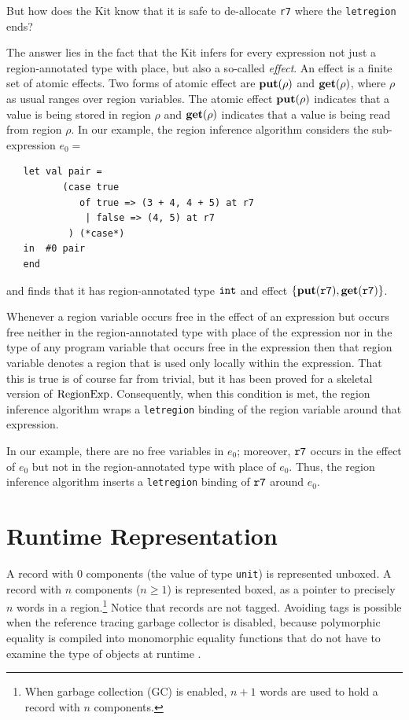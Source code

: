 \documentclass[12pt]{book}
\begin{document}
But how does the Kit know that it is safe to 
%
de-allocate {\tt r7} where the
%
{\tt letregion} ends?

The answer lies in the fact that the Kit infers for every expression
not just a region-annotated type with place, but also a so-called 
%
{\em effect}.  An effect is a finite set of 
%
atomic effects. Two forms of atomic effect are
%
$\mathop{\bf put}\nolimits(\rho)$ and 
%
$\mathop{\bf get}\nolimits(\rho)$, where $\rho$ as usual ranges over region variables. The
atomic effect $\mathop{\bf put}\nolimits(\rho)$ indicates that a value is being stored in
region $\rho$ and $\mathop{\bf get}\nolimits(\rho)$ indicates that a value is being read
from region $\rho$.  In our example, the region inference algorithm
considers the sub-expression $e_0 = $
\begin{verbatim}
   let val pair = 
          (case true 
             of true => (3 + 4, 4 + 5) at r7 
              | false => (4, 5) at r7
           ) (*case*) 
   in  #0 pair
   end  
\end{verbatim}
and finds that it has region-annotated type $\hbox{\tt int}$ and effect
$\{\mathop{\bf put}\nolimits(\hbox{\tt r7}), \mathop{\bf get}\nolimits(\hbox{\tt r7})\}$.

Whenever a region variable occurs free in the effect of an expression
but occurs free neither in the region-annotated type with place of the
expression nor in the type of any program variable that occurs free in
the expression then that region variable denotes a region that is used
only locally within the expression.  That this is true is of course
far from trivial, but it has been proved for a skeletal version of
$\hbox{\rm RegionExp}$.  Consequently, when this condition is met, the region
inference algorithm wraps a 
%
{\tt letregion} binding of the region variable around that expression.

In our example, there are no free variables in $e_0$; moreover,
$\hbox{\tt r7}$ occurs in the effect of $e_0$ but not in the
region-annotated type with place of $e_0$. Thus, the region inference
algorithm inserts a {\tt letregion} binding of $\hbox{\tt r7}$ around
$e_0$.

\section{Runtime Representation}
A 
%
record with 0 components (the value of type
%
{\tt unit}) is represented unboxed.  A record with $n$ components
($n\geq 1$) is represented boxed, as a pointer to precisely $n$ words
in a region.\footnote{When garbage collection (GC) is enabled, $n+1$
  words are used to hold a record with $n$ components.}  Notice that
records are not tagged. Avoiding tags is possible when the reference
tracing garbage collector is disabled, because
%
polymorphic equality is compiled into
%
monomorphic equality functions that do not have to examine the type of
objects at runtime \cite{ElsmanTIC98}.
\end{document}
